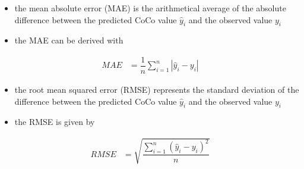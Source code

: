 \begin{itemize}
\item the mean absolute error (MAE) is the arithmetical average of the absolute difference between the predicted CoCo value $\hat{y}_i$ and the observed value $y_i$
\item the MAE can be derived with
\end{itemize}
\begin{align}
MAE &= \dfrac{1}{n} \sum_{i=1}^{n} |\hat{y}_i - y_i | 
\end{align}

\begin{itemize}
\item the root mean squared error (RMSE) represents the standard deviation of the difference between the predicted CoCo value $\hat{y}_i$ and the observed value $y_i$
\item the RMSE is given by
\end{itemize}
\begin{align}
RMSE &= \sqrt{\dfrac{\sum_{i=1}^{n} \left( \hat{y}_i - y_i \right)^2}{n}}
\end{align}